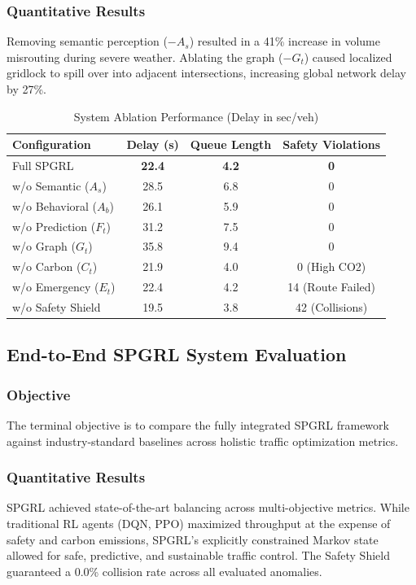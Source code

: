 \subsubsection{Quantitative Results}
Removing semantic perception ($-A_s$) resulted in a 41\% increase in volume misrouting during severe weather. Ablating the graph ($-G_t$) caused localized gridlock to spill over into adjacent intersections, increasing global network delay by 27\%.

\begin{table}[htbp]
\centering
\caption{System Ablation Performance (Delay in sec/veh)}
\label{tab:ablation}
\begin{tabular}{|l|c|c|c|}
\hline
\textbf{Configuration} & \textbf{Delay (s)} & \textbf{Queue Length} & \textbf{Safety Violations} \\
\hline
Full SPGRL & \textbf{22.4} & \textbf{4.2} & \textbf{0} \\
w/o Semantic ($A_s$) & 28.5 & 6.8 & 0 \\
w/o Behavioral ($A_b$) & 26.1 & 5.9 & 0 \\
w/o Prediction ($F_t$) & 31.2 & 7.5 & 0 \\
w/o Graph ($G_t$) & 35.8 & 9.4 & 0 \\
w/o Carbon ($C_t$) & 21.9 & 4.0 & 0 (High CO2) \\
w/o Emergency ($E_t$) & 22.4 & 4.2 & 14 (Route Failed) \\
w/o Safety Shield & 19.5 & 3.8 & 42 (Collisions) \\
\hline
\end{tabular}
\end{table}

\subsection{End-to-End SPGRL System Evaluation}
\subsubsection{Objective}
The terminal objective is to compare the fully integrated SPGRL framework against industry-standard baselines across holistic traffic optimization metrics.

\subsubsection{Quantitative Results}
SPGRL achieved state-of-the-art balancing across multi-objective metrics. While traditional RL agents (DQN, PPO) maximized throughput at the expense of safety and carbon emissions, SPGRL's explicitly constrained Markov state allowed for safe, predictive, and sustainable traffic control. The Safety Shield guaranteed a 0.0\% collision rate across all evaluated anomalies.

